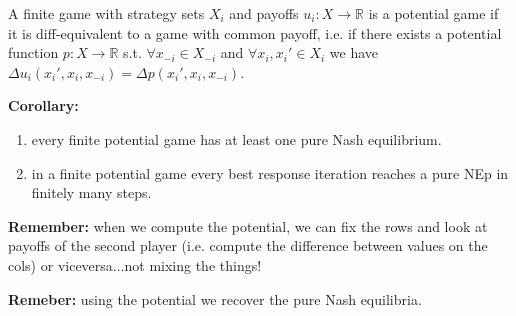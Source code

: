 \noindent A finite game with strategy sets $X_i$ and payoffs 
$u_i: X \rightarrow \mathbb{R}$ is a potential game if it is diff-equivalent to a game with common payoff, i.e. if there exists a potential function $p: X \rightarrow \mathbb{R}$ s.t. $\forall x_{-i} \in X_{-i}$ and $\forall x_i,x_i' \in X_i$ we have 
$\Delta u_i(x_i',x_i,x_{-i}) = \Delta p(x_i',x_i,x_{-i})$.

\bigskip
\noindent \textbf{Corollary:}
\begin{enumerate}
	\item every finite potential game has at least one pure Nash equilibrium.
	\item in a finite potential game every best response iteration reaches a pure NEp in finitely many steps.
\end{enumerate}

\noindent \textbf{Remember:} when we compute the potential, we can fix 
the rows and look at payoffs of the second player (i.e. compute the 
difference between values on the cols) or viceversa...not mixing the 
things!

\noindent \textbf{Remeber:} using the potential we recover the pure Nash 
equilibria.

